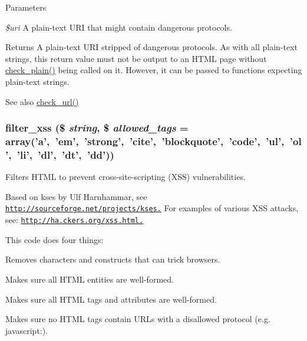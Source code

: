 \begin{DoxyParams}{Parameters}
\item[{\em \$uri}]A plain-\/text URI that might contain dangerous protocols.\end{DoxyParams}
\begin{DoxyReturn}{Returns}
A plain-\/text URI stripped of dangerous protocols. As with all plain-\/text strings, this return value must not be output to an HTML page without \hyperlink{group__sanitization_ga76fc67a30fd8d75ddd80565e6e65a13d}{check\_\-plain()} being called on it. However, it can be passed to functions expecting plain-\/text strings.
\end{DoxyReturn}
\begin{DoxySeeAlso}{See also}
\hyperlink{group__sanitization_gac024315b69035ef05c33674838707919}{check\_\-url()} 
\end{DoxySeeAlso}
\hypertarget{group__sanitization_ga8864a29ffa8de5c9f8dc9e417060660d}{
\subsubsection[{filter\_\-xss}]{\setlength{\rightskip}{0pt plus 5cm}filter\_\-xss (\$ {\em string}, \/  \$ {\em allowed\_\-tags} = {\ttfamily array('a',~'em',~'strong',~'cite',~'blockquote',~'code',~'ul',~'ol',~'li',~'dl',~'dt',~'dd')})}}
\label{group__sanitization_ga8864a29ffa8de5c9f8dc9e417060660d}
Filters HTML to prevent cross-\/site-\/scripting (XSS) vulnerabilities.

Based on kses by Ulf Harnhammar, see \href{http://sourceforge.net/projects/kses.}{\tt http://sourceforge.net/projects/kses.} For examples of various XSS attacks, see: \href{http://ha.ckers.org/xss.html.}{\tt http://ha.ckers.org/xss.html.}

This code does four things:
\begin{DoxyItemize}
\item Removes characters and constructs that can trick browsers.
\item Makes sure all HTML entities are well-\/formed.
\item Makes sure all HTML tags and attributes are well-\/formed.
\item Makes sure no HTML tags contain URLs with a disallowed protocol (e.g. javascript:).
\end{DoxyItemize}



